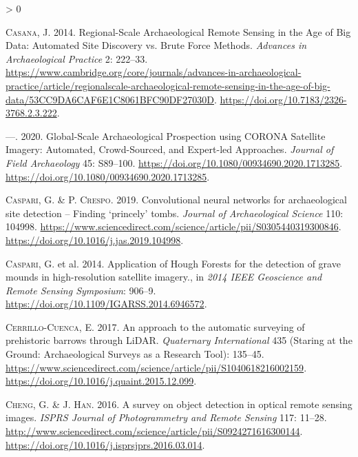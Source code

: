\documentclass[
  12pt,
]{article}
\newlength{\cslhangindent}
\newenvironment{CSLReferences}[2] %
 {%
  \setlength{\parindent}{0pt}
  \ifodd #1 \everypar{\setlength{\hangindent}{\cslhangindent}}\ignorespaces\fi
  \ifnum #2 > 0
  \setlength{\parskip}{#2\baselineskip}
  \fi
 }%
 {}
\begin{document}
\begin{CSLReferences}{1}{0}
\leavevmode\hypertarget{ref-casanaRegionalScaleArchaeologicalRemote2014}{}%
\textsc{Casana}, J. 2014. Regional-{Scale} {Archaeological} {Remote} {Sensing} in the {Age} of {Big} {Data}: {Automated} {Site} {Discovery} vs. {Brute} {Force} {Methods}. \emph{Advances in Archaeological Practice} 2: 222--33. \url{https://www.cambridge.org/core/journals/advances-in-archaeological-practice/article/regionalscale-archaeological-remote-sensing-in-the-age-of-big-data/53CC9DA6CAF6E1C8061BFC90DF27030D}. \url{https://doi.org/10.7183/2326-3768.2.3.222}.

\leavevmode\hypertarget{ref-casanaGlobalScaleArchaeologicalProspection2020}{}%
---. 2020. Global-{Scale} {Archaeological} {Prospection} using {CORONA} {Satellite} {Imagery}: {Automated}, {Crowd}-{Sourced}, and {Expert}-led {Approaches}. \emph{Journal of Field Archaeology} 45: S89--100. \url{https://doi.org/10.1080/00934690.2020.1713285}. \url{https://doi.org/10.1080/00934690.2020.1713285}.

\leavevmode\hypertarget{ref-caspariConvolutionalNeuralNetworks2019a}{}%
\textsc{Caspari}, G. \& P. \textsc{Crespo}. 2019. Convolutional neural networks for archaeological site detection -- {Finding} {`princely'} tombs. \emph{Journal of Archaeological Science} 110: 104998. \url{https://www.sciencedirect.com/science/article/pii/S0305440319300846}. \url{https://doi.org/10.1016/j.jas.2019.104998}.

\leavevmode\hypertarget{ref-caspariApplicationHoughForests2014a}{}%
\textsc{Caspari}, G. et al. 2014. Application of {Hough} {Forests} for the detection of grave mounds in high-resolution satellite imagery., in \emph{2014 {IEEE} {Geoscience} and {Remote} {Sensing} {Symposium}}: 906--9. \url{https://doi.org/10.1109/IGARSS.2014.6946572}.

\leavevmode\hypertarget{ref-cerrillo-cuencaApproachAutomaticSurveying2017a}{}%
\textsc{Cerrillo-Cuenca}, E. 2017. An approach to the automatic surveying of prehistoric barrows through {LiDAR}. \emph{Quaternary International} 435 (Staring at the Ground: {Archaeological} Surveys as a Research Tool): 135--45. \url{https://www.sciencedirect.com/science/article/pii/S1040618216002159}. \url{https://doi.org/10.1016/j.quaint.2015.12.099}.

\leavevmode\hypertarget{ref-chengSurveyObjectDetection2016a}{}%
\textsc{Cheng}, G. \& J. \textsc{Han}. 2016. A survey on object detection in optical remote sensing images. \emph{ISPRS Journal of Photogrammetry and Remote Sensing} 117: 11--28. \url{http://www.sciencedirect.com/science/article/pii/S0924271616300144}. \url{https://doi.org/10.1016/j.isprsjprs.2016.03.014}.


\end{CSLReferences}
\end{document}
